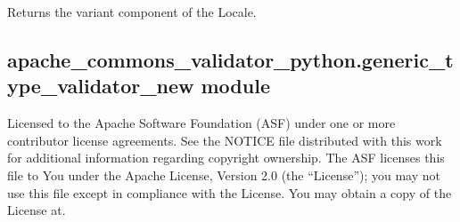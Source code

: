 \documentclass[letterpaper,10pt,english]{sphinxmanual}
\begin{document}
\begin{fulllineitems}
\begin{fulllineitems}
\end{fulllineitems}


\begin{fulllineitems}
\label{\detokenize{apache_commons_validator_python:id16}}
\pysigstartsignatures
{}
\pysigstopsignatures
\end{fulllineitems}


\begin{fulllineitems}
\label{\detokenize{apache_commons_validator_python:id17}}
\pysigstartsignatures
{}
\pysigstopsignatures
\sphinxAtStartPar
Returns the variant component of the Locale.

\end{fulllineitems}


\end{fulllineitems}



\subsection{apache\_commons\_validator\_python.generic\_type\_validator\_new module}
\label{\detokenize{apache_commons_validator_python:module-apache_commons_validator_python.generic_type_validator_new}}\label{\detokenize{apache_commons_validator_python:apache-commons-validator-python-generic-type-validator-new-module}}
\sphinxAtStartPar
Licensed to the Apache Software Foundation (ASF) under one or more contributor
license agreements.  See the NOTICE file distributed with this work for additional
information regarding copyright ownership. The ASF licenses this file to You under the
Apache License, Version 2.0 (the “License”); you may not use this file except in
compliance with the License.  You may obtain a copy of the License at.
\end{document}
